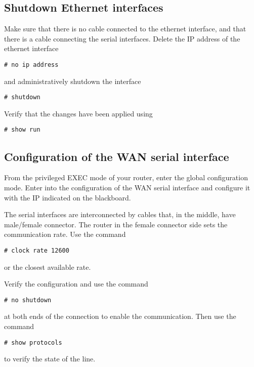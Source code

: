 \subsection{Shutdown Ethernet interfaces}

Make sure that there is no cable connected to the ethernet interface, and that there is a cable connecting the serial interfaces.
Delete the IP address of the ethernet interface
\begin{lstlisting}
# no ip address
\end{lstlisting}
and administratively shutdown the interface
\begin{lstlisting}
# shutdown
\end{lstlisting}

Verify that the changes have been applied using
\begin{lstlisting}
# show run
\end{lstlisting}

\subsection{Configuration of the WAN serial interface}

From the privileged EXEC mode of your router, enter the global configuration mode.
Enter into the configuration of the WAN serial interface and configure it with the IP indicated on the blackboard.

The serial interfaces are interconnected by cables that, in the middle, have male/female connector.
The router in the female connector side sets the communication rate.
Use the command 
\begin{lstlisting}
# clock rate 12600
\end{lstlisting}
or the closest available rate.

Verify the configuration and use the command
\begin{lstlisting}
# no shutdown 
\end{lstlisting}
at both ends of the connection to enable the communication.
Then use the command
\begin{lstlisting}
# show protocols
\end{lstlisting}
to verify the state of the line.

